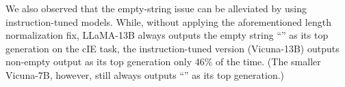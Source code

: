 

We also observed that the empty-string issue can be alleviated by using instruction\hyp tuned models.
%
While, without applying the aforementioned length normalization fix, LLaMA-13B always outputs the empty string ``\EOS'' as its top generation on the cIE task, the instruction\hyp tuned version (Vicuna-13B) outputs non-empty output as its top generation only 46\% of the time.
(The smaller Vicuna-7B, however, still always outputs ``\EOS'' as its top generation.)

